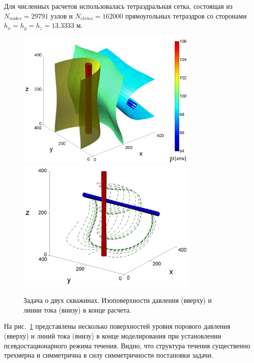 Для численных расчетов использовалась тетраэдральная сетка, состоящая из 
$N_{nodes} = 29791$ узлов и $N_{elems} = 162000$ прямоугольных тетраэдров со сторонами
$h_x = h_y = h_z = 13.3333$ м. 

%
\begin{figure}[t!]
\centering
\includegraphics[width=0.8\textwidth]{./figs/iso_p.png}\\
\includegraphics[width=0.8\textwidth]{./figs/str.png}
\caption{Задача о двух скважинах. Изоповерхности давления (вверху) и линии тока (внизу) в конце расчета.}\label{fig:iso}
\end{figure}
% 

На рис.~\ref{fig:iso} представлены несколько поверхностей уровня
порового давления (вверху) и линий тока (внизу) 
в конце моделирования при установлении псевдостационарного режима течения.
Видно, что структура течения существенно трехмерна и симметрична в силу симметричности постановки задачи.


\endinput
